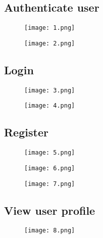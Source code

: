 \documentclass[english]{article}
\begin{document}
\subsection{Authenticate user}
\begin{figure}[ht!]
\hspace*{-2.5cm} 
\texttt{[image: 1.png]}
\end{figure}

\begin{figure}[ht!]
\hspace*{-2.5cm} 
\texttt{[image: 2.png]}
\end{figure}

\subsection{Login}
\begin{figure}[H]
\hspace*{-2.5cm} 
\texttt{[image: 3.png]}
\end{figure}


\begin{figure}[H]
\hspace*{-2.5cm} 
\texttt{[image: 4.png]}
\end{figure}

\subsection{Register}

\begin{figure}[H]
    \label{tab:example}
\hspace*{-2.5cm} 
\texttt{[image: 5.png]}
\end{figure}

\begin{figure}[H]
\hspace*{-2.5cm} 
\texttt{[image: 6.png]}
\end{figure}

\begin{figure}[H]
\hspace*{-2.5cm} 
\texttt{[image: 7.png]}
\end{figure}

\subsection{View user profile}
\begin{figure}[ht!]
\hspace*{-2.5cm} 
\texttt{[image: 8.png]}
\end{figure}
\end{document}
